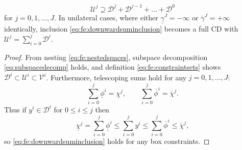 \documentclass[review,hidelinks,onefignum,onetabnum,final]{siamart220329}  %
\newcommand{\cV}{\mathcal{V}}
\begin{document}
\begin{lemma}  \label{lem:downwardadmissibility}
\begin{equation}
\mathcal{U}^j \supseteq \mathcal{D}^j + \mathcal{D}^{j-1} + \dots + \mathcal{D}^0 \label{eq:fe:downwardsuminclusion}
\end{equation}
for $j=0,1,\dots,J$.  In unilateral cases, where either $\underline{\gamma}^J=-\infty$ or $\overline{\gamma}^J=+\infty$ identically, inclusion \eqref{eq:fe:downwardsuminclusion} becomes a full CD with $\mathcal{U}^j=\sum_{i=0}^j \mathcal{D}^i$.
\end{lemma}

\begin{proof}  From nesting \eqref{eq:fe:nestedspaces}, subspace decomposition \eqref{eq:subspacedecomp} holds, and definition \eqref{eq:fe:constraintsets} shows $\mathcal{D}^i \subset \mathcal{U}^i \subset \cV^i$.  Furthermore, telescoping sums hold for any $j=0,1,\dots,J$:
\begin{equation}
\sum_{i=0}^j \underline{\phi}^i = \underline{\chi}^j, \qquad \sum_{i=0}^j \overline{\phi}^i = \overline{\chi}^j.  \label{eq:fe:telescoping}
\end{equation}
Thus if $y^i \in \mathcal{D}^i$ for $0 \le i \le j$ then
\begin{equation}
\underline{\chi}^j = \sum_{i=0}^j \underline{\phi}^i \le \sum_{i=0}^j y^i \le \sum_{i=0}^j \overline{\phi}^i \le \overline{\chi}^j, \label{eq:fe:lemmaordering}
\end{equation}
so \eqref{eq:fe:downwardsuminclusion} holds for any box constraints.


\end{proof}
\end{document}
